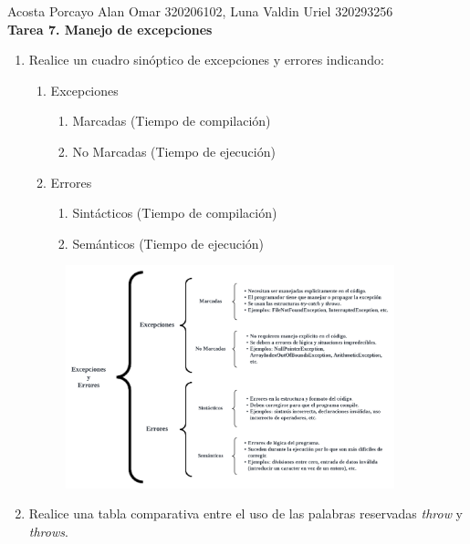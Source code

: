 \documentclass[12pt]{article}
\newcommand{\linejump}{\hfill \break}
\begin{document}
  \begin{center}
    Acosta Porcayo Alan Omar 320206102, Luna Valdin Uriel 320293256 \\
    \linejump
    \LARGE \textbf{Tarea 7. Manejo de excepciones}
  \end{center}
  
  \linejump
  \begin{enumerate}
    \item Realice un cuadro sinóptico de excepciones y errores indicando:
    \begin{enumerate}[label=\alph*.]
      \item Excepciones
      \begin{enumerate}[label=\roman*.]
        \item Marcadas (Tiempo de compilación)
        \item No Marcadas (Tiempo de ejecución)
      \end{enumerate}
      \item Errores
      \begin{enumerate}[label=\roman*.]
        \item Sintácticos (Tiempo de compilación)
        \item Semánticos (Tiempo de ejecución)
      \end{enumerate}
    \end{enumerate}

    \begin{figure}[h!]
      \centering
      \includegraphics[width=0.9\textwidth]{sinoptico.png}
    \end{figure}

    \newpage
    \item Realice una tabla comparativa entre el uso de las palabras reservadas \textit{throw} y \textit{throws}.
    

\end{enumerate}
\end{document}
